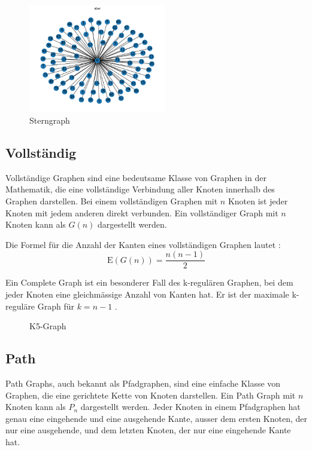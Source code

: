 \begin{figure}[H]
    \centering
    \includegraphics[width=6cm]{images/20_material_methods/star.png}
    \caption{Sterngraph}
    \label{fig:star-graph}
\end{figure}

\subsection{Vollständig} \label{sec:complete}

Vollständige Graphen sind eine bedeutsame Klasse von Graphen in der Mathematik, die eine vollständige Verbindung aller Knoten innerhalb des Graphen darstellen.
Bei einem vollständigen Graphen mit $n$ Knoten ist jeder Knoten mit jedem anderen direkt verbunden.
Ein vollständiger Graph mit $n$ Knoten kann als $G(n)$ dargestellt werden.

Die Formel für die Anzahl der Kanten eines vollständigen Graphen lautet \cite[p.~53]{barabasi_network_2016}:
\begin{equation}
    \text{E}(G(n)) = \frac{n(n-1)}{2}
\end{equation}

Ein Complete Graph ist ein besonderer Fall des k-regulären Graphen, bei dem jeder Knoten eine gleichmässige Anzahl von Kanten hat.
Er ist der maximale k-reguläre Graph für $k = n-1$ \cite{bang-jensen_basic_2018}.

\begin{figure}[H]
    \centering
    
    \caption{K5-Graph}
    \label{fig:k5-graph}
\end{figure}

\subsection{Path}

Path Graphs, auch bekannt als Pfadgraphen, sind eine einfache Klasse von Graphen, die eine gerichtete Kette von Knoten darstellen.
Ein Path Graph mit $n$ Knoten kann als $P_n$ dargestellt werden.
Jeder Knoten in einem Pfadgraphen hat genau eine eingehende und eine ausgehende Kante, ausser dem ersten Knoten, der nur eine ausgehende, und dem letzten Knoten, der nur eine eingehende Kante hat.

